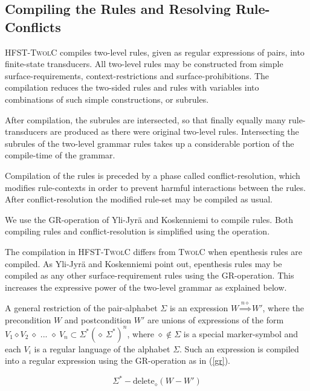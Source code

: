 \documentclass[postprint]{flammie}
\begin{document}
\subsection{Compiling the Rules and Resolving Rule-Conflicts}

\textsc{HFST-TwolC} compiles two-level rules, given as regular
expressions of pairs, into finite-state transducers. All two-level
rules may be constructed from simple surface-requirements,
context-restrictions and surface-prohibitions. The compilation reduces
the two-sided rules and rules with variables into combinations of such
simple constructions, or subrules.

After compilation, the subrules are intersected, so that finally
equally many rule-transducers are produced as there were original
two-level rules. Intersecting the subrules of the two-level grammar
rules takes up a considerable portion of the compile-time of the
grammar.

Compilation of the rules is preceded by a phase called
conflict-resolution, which modifies rule-contexts in order to prevent
harmful interactions between the rules. After conflict-resolution the
modified rule-set may be compiled as usual.

We use the GR-operation of Yli-Jyr\"a and Koskenniemi
\cite{Yli-Jyra06} to compile rules. Both compiling rules and
conflict-resolution is simplified using the operation.

The compilation in \textsc{HFST-TwolC} differs from \textsc{TwolC}
when epenthesis rules are compiled. As Yli-Jyr\"a and Koskenniemi
\cite{Yli-Jyra06} point out, epenthesis rules may be compiled as any
other surface-requirement rules using the GR-operation. This increases
the expressive power of the two-level grammar as explained below.

A general restriction of the pair-alphabet $\Sigma$ is an expression
$W \overset{n\diamond}{\Rightarrow}W'$, where the precondition $W$ and
postcondition $W'$ are unions of expressions of the form $V_1 \diamond
V_2\ \diamond \text{ ... }\diamond\ V_n \subset \Sigma^* (\diamond\
\Sigma^*)^n$, where $\diamond \notin \Sigma$ is a special
marker-symbol and each $V_i$ is a regular language of the alphabet
$\Sigma$. Such an expression is compiled into a regular expression
using the GR-operation as in (\ref{gr}).

\begin{equation}
  \label{gr}
  \Sigma^* - \text{delete}_{\diamond}(W - W')
\end{equation}
\end{document}
